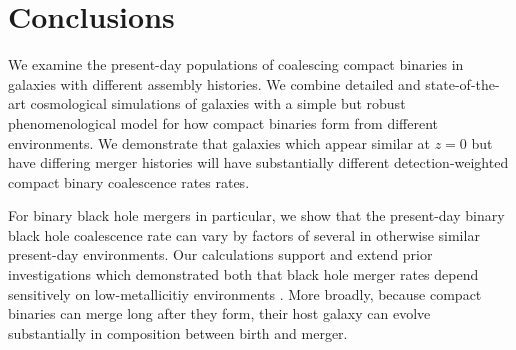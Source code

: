 \documentclass[nofootinbib,twocolumn,prd]{emulateapj}
\newcommand\editremark[1]{{\color{red}#1}}
\newcommand\jillianremark[1]{{\color{blue}#1}}
\begin{document}






\section{Conclusions}
\label{sec:conclude}

We examine the present-day populations of coalescing compact binaries in galaxies with different assembly histories.  We
combine  detailed and state-of-the-art cosmological simulations of galaxies with a simple but robust phenomenological
model for how compact binaries form from different environments.   
 We demonstrate that
galaxies which appear similar at $z = 0$ but have differing merger histories will have substantially different
detection-weighted compact binary
coalescence rates rates.   


For binary black hole mergers in particular, we show that the present-day binary black hole coalescence rate can vary by factors of several in otherwise
similar present-day environments.   Our calculations support and extend prior investigations which demonstrated both
that black hole merger rates depend sensitively on low-metallicitiy environments
\citep[see,e.g.][]{PSellipticals,popsyn-LowMetallicityImpact2b-StarTrackRevised-2013,gwastro-EventPopsynPaper-2016}.   More broadly,
because compact binaries can merge long after they form, their host galaxy can evolve substantially in composition
between birth and merger.
\end{document}
